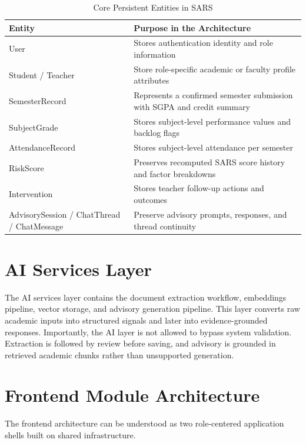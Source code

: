 \begin{table}[H]
\centering
\caption{Core Persistent Entities in SARS}
\begin{tabularx}{\textwidth}{>{\raggedright\arraybackslash}p{} >{\raggedright\arraybackslash}X}
\toprule
\textbf{Entity} & \textbf{Purpose in the Architecture} \\
\midrule
User & Stores authentication identity and role information \\
Student / Teacher & Store role-specific academic or faculty profile attributes \\
SemesterRecord & Represents a confirmed semester submission with SGPA and credit summary \\
SubjectGrade & Stores subject-level performance values and backlog flags \\
AttendanceRecord & Stores subject-level attendance per semester \\
RiskScore & Preserves recomputed SARS score history and factor breakdowns \\
Intervention & Stores teacher follow-up actions and outcomes \\
AdvisorySession / ChatThread / ChatMessage & Preserve advisory prompts, responses, and thread continuity \\
\bottomrule
\end{tabularx}
\end{table}

\section{AI Services Layer}
The AI services layer contains the document extraction workflow, embeddings pipeline, vector storage, and advisory generation pipeline. This layer converts raw academic inputs into structured signals and later into evidence-grounded responses. Importantly, the AI layer is not allowed to bypass system validation. Extraction is followed by review before saving, and advisory is grounded in retrieved academic chunks rather than unsupported generation.

\section{Frontend Module Architecture}
The frontend architecture can be understood as two role-centered application shells built on shared infrastructure.

